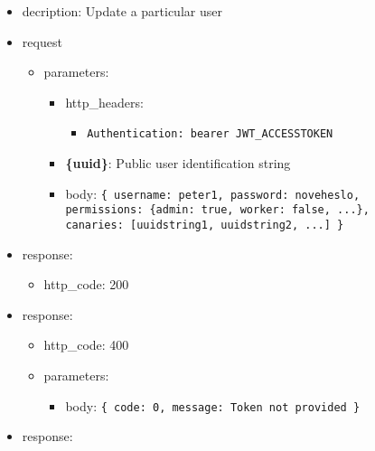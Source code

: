\documentclass[
]{article}
\begin{document}
\begin{itemize}
\item
  decription: Update a particular user
\item
  request

  \begin{itemize}
  \item
    parameters:

    \begin{itemize}
    \item
      http\_headers:

      \begin{itemize}
      \item
        \texttt{Authentication:\ \textquotesingle{}bearer\ JWT\_ACCESSTOKEN\textquotesingle{}}
      \end{itemize}
    \item
      \textbf{\{uuid\}}: Public user identification string
    \item
      body: \texttt{\{
      \textquotesingle{}username\textquotesingle{}:\ \textquotesingle{}peter1\textquotesingle{},
      \textquotesingle{}password\textquotesingle{}:\ \textquotesingle{}noveheslo\textquotesingle{},
      \textquotesingle{}permissions\textquotesingle{}:\ \{\textquotesingle{}admin\textquotesingle{}:\ true,\ \textquotesingle{}worker\textquotesingle{}:\ false,\ ...\},
      \textquotesingle{}canaries\textquotesingle{}:\ {[}\textquotesingle{}uuidstring1\textquotesingle{},\ \textquotesingle{}uuidstring2\textquotesingle{},\ ...{]}
      \}}
    \end{itemize}
  \end{itemize}
\item
  response:

  \begin{itemize}
  \item
    http\_code: 200
  \end{itemize}
\item
  response:

  \begin{itemize}
  \item
    http\_code: 400
  \item
    parameters:

    \begin{itemize}
    \item
      body: \texttt{\{
      \textquotesingle{}code\textquotesingle{}:\ 0,\ 
      \textquotesingle{}message\textquotesingle{}:\ \textquotesingle{}Token\ not\ provided\textquotesingle{}
      \}}
    \end{itemize}
  \end{itemize}
\item
  response:


\end{itemize}
\end{document}
